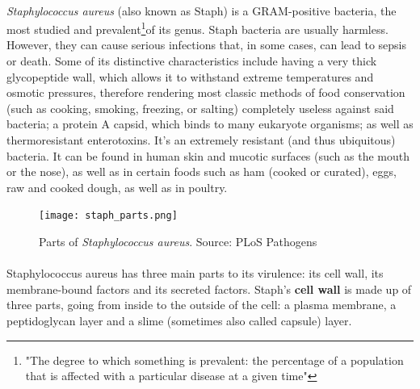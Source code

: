 \paragraph{}\emph{Staphylococcus aureus} (also known as Staph) is a GRAM-positive bacteria, the most studied and prevalent\footnote{"The degree to which something is prevalent: the percentage of a population that is affected with a particular disease at a given time"\cite{DefinitionPREVALENCE1970}}of its genus. Staph bacteria are usually harmless. However, they can cause serious infections that, in some cases, can lead to sepsis or death. Some of its distinctive characteristics include having a very thick glycopeptide wall, which allows it to withstand extreme temperatures and osmotic pressures, therefore rendering most classic methods of food conservation (such as cooking, smoking, freezing, or salting) completely useless against said bacteria; a protein A capsid, which binds to many eukaryote organisms; as well as thermoresistant enterotoxins. It's an extremely resistant (and thus ubiquitous) bacteria. It can be found in human skin and mucotic surfaces (such as the mouth or the nose), as well as in certain foods such as ham (cooked or curated), eggs, raw and cooked dough, as well as in poultry.\newpage
\begin{figure}\begin{center}\texttt{[image: staph\_parts.png]}\end{center}\caption{Parts of \emph{Staphylococcus aureus}. Source: PLoS Pathogens}\end{figure}\paragraph{}Staphylococcus aureus has three main parts to its virulence: its cell wall, its membrane-bound factors and its secreted factors. Staph's \textbf{cell wall} is made up of three parts, going from inside to the outside of the cell: a plasma membrane, a peptidoglycan layer and a slime (sometimes also called capsule) layer. %
